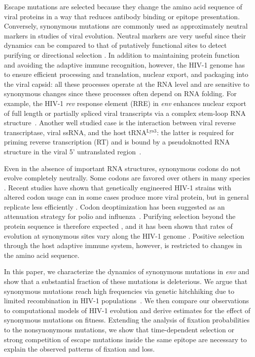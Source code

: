 \documentclass[10pt]{article}
\newcommand{\rev}{\textit{rev}}
\newcommand{\env}{\textit{env}}
\begin{document}
Escape mutations are selected because they change the amino acid sequence
of viral proteins in a way that reduces antibody binding or epitope presentation. 
Conversely, synonymous mutations are commonly used as
approximately neutral markers in studies of viral evolution. Neutral markers are
very useful since their dynamics can be compared to that of putatively
functional sites to detect purifying or directional selection
\cite{Bhatt:2011p43255,Hurst:2002p32608,Chen:2004p22606}. In addition to
maintaining protein function and avoiding the adaptive immune recognition,
however, the HIV-1 genome has to ensure efficient processing and translation,
nuclear export, and packaging into the viral capsid: all these processes operate
at the RNA level and are sensitive to synonymous changes since these processes
often depend on RNA folding. For example, the HIV-1 \rev{} response element (RRE)
in \env{} enhances nuclear export of full length or partially spliced viral
transcripts via a complex stem-loop RNA structure~\cite{fernandes_hiv-1_2012}.
Another well studied case is the interaction between viral reverse
transcriptase, viral ssRNA, and the host tRNA$^\text{Lys3}$: the latter is
required for priming reverse transcription (RT) and is bound by a pseudoknotted
RNA structure in the viral 5' untranslated region~\cite{barat_interaction_1991,
paillart_vitro_2002}.

Even in the absence of important RNA structures, synonymous codons do not evolve
completely neutrally. Some codons are favored over others in many species
\cite{plotkin_synonymous_2011}. Recent studies have shown that genetically
engineered HIV-1 strains with altered codon usage can in some cases produce more
viral protein, but in general replicate less efficiently
\cite{ngumbela_quantitative_2008, li_codon-usage-based_2012,
keating_rich_2009}. Codon deoptimization has been suggested as an attenuation
strategy for polio and influenza~\cite{mueller_live_2010,coleman_virus_2008}.
Purifying selection beyond the protein sequence is therefore expected
\cite{forsdyke_reciprocal_1995,snoeck_mapping_2011}, and it has been shown that
rates of evolution at synonymous sites vary along the HIV-1 genome
\cite{mayrose_towards_2007}. Positive selection through the host adaptive
immune system, however, is restricted to changes in the amino acid sequence.

In this paper, we characterize the dynamics of synonymous mutations in \env{}
and show that a substantial fraction of these mutations is deleterious.  We
argue that synonymous mutations reach high frequencies via genetic hitchhiking
due to limited recombination in HIV-1 populations~\cite{neher_recombination_2010,
batorsky_estimate_2011}. We then compare our observations to computational
models of HIV-1 evolution and derive estimates for the effect of synonymous mutations
 on fitness.  Extending the analysis of fixation probabilities to the
nonsynonymous mutations, we show that time-dependent selection or strong
competition of escape mutations inside the same epitope are necessary to explain
the observed patterns of fixation and loss.
\end{document}
